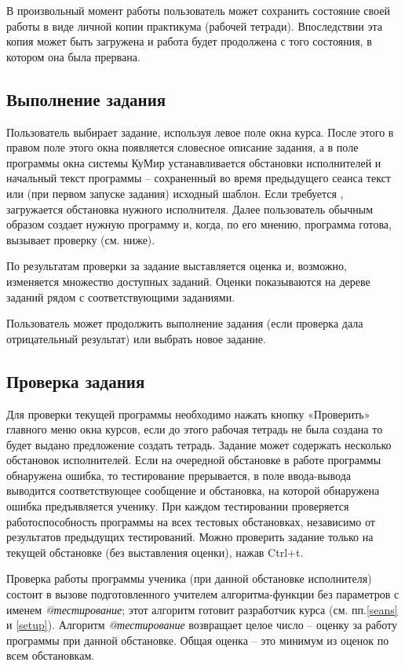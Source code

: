 	В произвольный момент работы пользователь может сохранить состояние своей работы в виде личной копии практикума (рабочей тетради). Впоследствии эта копия может быть загружена и работа будет продолжена с того состояния, в котором она была прервана.


\subsection {Выполнение задания }
Пользователь выбирает задание, используя левое поле окна курса. После этого в правом поле этого окна появляется словесное описание задания, а в поле программы окна системы КуМир устанавливается обстановки исполнителей и начальный текст программы – сохраненный во время предыдущего сеанса текст или (при первом запуске задания) исходный шаблон. Если требуется , загружается обстановка нужного исполнителя. 
	Далее пользователь обычным образом создает нужную программу и, когда, по его мнению, программа готова, вызывает проверку (см. ниже). 
	
	По результатам проверки за задание выставляется оценка и, возможно, изменяется множество доступных заданий. Оценки показываются на дереве заданий рядом с соответствующими заданиями.
	
	Пользователь может продолжить выполнение задания (если проверка дала отрицательный результат) или выбрать новое задание. 


\subsection {Проверка задания} \label{test}
	Для проверки текущей программы необходимо нажать кнопку «Проверить» главного меню окна курсов, если до этого рабочая тетрадь не была создана то будет выдано предложение создать тетрадь. Задание может содержать несколько обстановок исполнителей. Если на очередной обстановке в работе программы обнаружена ошибка, то тестирование прерывается, в поле ввода-вывода выводится соответствующее сообщение и обстановка, на которой обнаружена ошибка предъявляется ученику. При каждом тестировании проверяется работоспособность программы на всех тестовых обстановках, независимо от результатов предыдущих тестирований.  Можно проверить задание только на текущей обстановке (без выставления оценки), нажав Ctrl+t.
	
	Проверка работы программы ученика (при данной обстановке исполнителя) состоит в вызове подготовленного учителем алгоритма-функции без параметров с именем 
	\emph{@тестирование}; этот алгоритм готовит разработчик курса (см. пп.\ref{seans} и \ref{setup}). Алгоритм \emph{@тестирование} возвращает целое число – оценку за работу программы при данной обстановке. Общая оценка – это минимум из оценок по всем обстановкам. 
	
